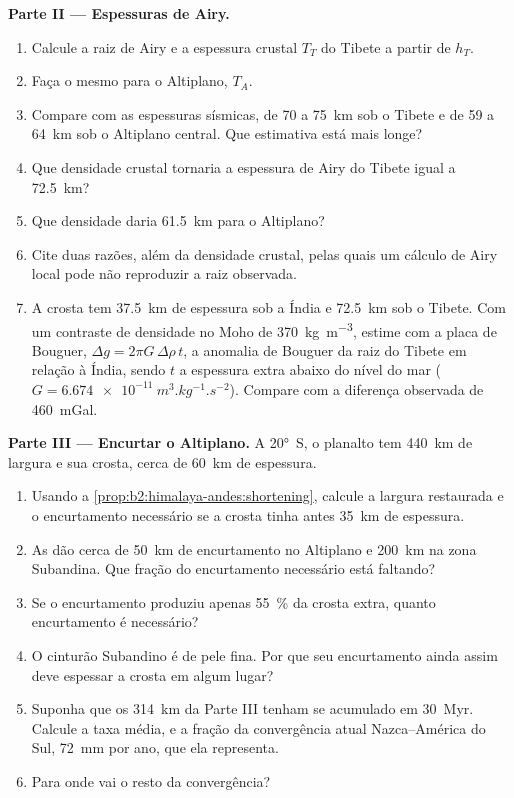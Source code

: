 \begin{problem}
\noindent\textbf{Parte II --- Espessuras de Airy.}
\begin{enumerate}[resume]
\item Calcule a raiz de Airy e a espessura crustal $T_T$ do Tibete a partir de $h_T$.
\item Faça o mesmo para o Altiplano, $T_A$.
\item Compare com as espessuras sísmicas, de 70 a \qty{75}{km} sob o Tibete e de 59 a
\qty{64}{km} sob o Altiplano central. Que estimativa está mais longe?
\item Que densidade crustal tornaria a espessura de Airy do Tibete igual a \qty{72.5}{km}?
\item Que densidade daria \qty{61.5}{km} para o Altiplano?
\item Cite duas razões, além da densidade crustal, pelas quais um cálculo de Airy local pode
não reproduzir a raiz observada.
\item A crosta tem \qty{37.5}{km} de espessura sob a Índia e \qty{72.5}{km} sob o Tibete. Com um
contraste de densidade no Moho de \qty{370}{kg.m^{-3}}, estime com a placa de Bouguer, $\Delta g
= 2\pi G\,\Delta\rho\,t$, a anomalia de Bouguer da raiz do Tibete em relação à Índia, sendo $t$ a
espessura extra abaixo do nível do mar ($G = \qty{6.674e-11}{m^3.kg^{-1}.s^{-2}}$). Compare com a
diferença observada de \qty{460}{mGal}.
\end{enumerate}

\noindent\textbf{Parte III --- Encurtar o Altiplano.} A \ang{20}~S, o planalto tem
\qty{440}{km} de largura e sua crosta, cerca de \qty{60}{km} de espessura.
\begin{enumerate}[resume]
\item Usando a \cref{prop:b2:himalaya-andes:shortening}, calcule a largura restaurada e o
encurtamento necessário se a crosta tinha antes \qty{35}{km} de espessura.
\item As  dão cerca de \qty{50}{km} de encurtamento no Altiplano e
\qty{200}{km} na zona Subandina. Que fração do encurtamento necessário está faltando?
\item Se o encurtamento produziu apenas \qty{55}{\percent} da crosta extra, quanto encurtamento é
necessário?
\item O cinturão Subandino é de pele fina. Por que seu encurtamento ainda assim deve espessar a crosta
em algum lugar?
\item Suponha que os \qty{314}{km} da Parte III tenham se acumulado em \qty{30}{Myr}. Calcule a taxa
média, e a fração da convergência atual Nazca--América do Sul, \qty{72}{mm} por ano, que
ela representa.
\item Para onde vai o resto da convergência?
\end{enumerate}


\end{problem}
